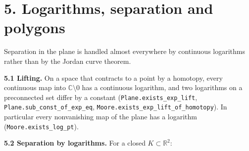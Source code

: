 \documentclass[11pt]{article}
\newcommand{\lean}[1]{\texttt{#1}}
\begin{document}
\section*{5. Logarithms, separation and polygons}

Separation in the plane is handled almost everywhere by continuous logarithms rather than by the Jordan curve theorem.

\textbf{5.1 Lifting.} On a space that contracts to a point by a homotopy, every continuous map into $\mathbb{C} \setminus 0$ has a continuous logarithm, and two logarithms on a preconnected set differ by a constant (\lean{Plane.\hspace{0pt}exists\_\hspace{0pt}exp\_\hspace{0pt}lift}, \lean{Plane.\hspace{0pt}sub\_\hspace{0pt}const\_\hspace{0pt}of\_\hspace{0pt}exp\_\hspace{0pt}eq}, \lean{Moore.\hspace{0pt}exists\_\hspace{0pt}exp\_\hspace{0pt}lift\_\hspace{0pt}of\_\hspace{0pt}homotopy}). In particular every nonvanishing map of the plane has a logarithm (\lean{Moore.\hspace{0pt}exists\_\hspace{0pt}log\_\hspace{0pt}pt}).

\textbf{5.2 Separation by logarithms.} For a closed $K \subset \mathbb{R}^2$:
\end{document}
